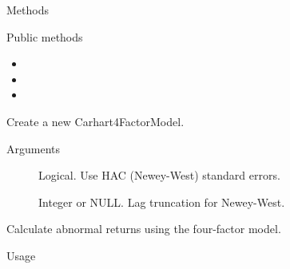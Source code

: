 \documentclass[a4paper]{book}
\begin{document}
%
\begin{Section}{Methods}
%
\begin{SubSection}{Public methods}
\begin{itemize}

\item{} 
\item{} 
\item{} 

\end{itemize}

\end{SubSection}




\hypertarget{method-Carhart4FactorModel-initialize}{}
%
\begin{SubSection}{}
Create a new Carhart4FactorModel.
%

%
\begin{SubSubSection}{Arguments}

\begin{description}

\item[] Logical. Use HAC (Newey-West) standard errors.
\item[] Integer or NULL. Lag truncation for Newey-West.

\end{description}



\end{SubSubSection}

\end{SubSection}




\hypertarget{method-Carhart4FactorModel-abnormal_returns}{}
%
\begin{SubSection}{}
Calculate abnormal returns using the four-factor model.
%
\begin{SubSubSection}{Usage}


\end{SubSubSection}
\end{SubSection}
\end{Section}
\end{document}
